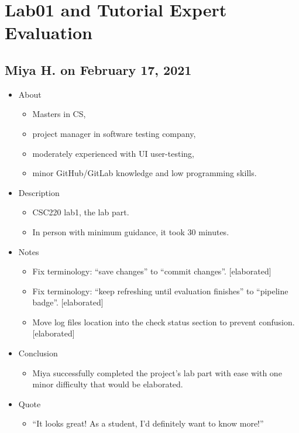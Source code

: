 \section{Lab01 and Tutorial Expert Evaluation}\label{sec:lab01exp}

\subsection{Miya H. on February 17, 2021}\label{ssec:miya0217}

\begin{itemize}
\item
  {About}
  \begin{itemize}
  \item
    {Masters in CS,}
  \item
    {project manager in software testing company,}
  \item
    {moderately experienced with UI user-testing,}
  \item
    {minor GitHub/GitLab knowledge and low programming skills.}
  \end{itemize}

\item
  {Description}
  \begin{itemize}
  \item
    {CSC220 lab1, the lab part.}
  \item
    {In person with minimum guidance, it took 30 minutes.}
  \end{itemize}

\item
  {Notes}
  \begin{itemize}
  \item
    {Fix terminology: ``save changes'' to ``commit changes''. {[}elaborated{]}}
  \item
    {Fix terminology: ``keep refreshing until evaluation finishes'' to ``pipeline badge''. {[}elaborated{]}}
  \item
    {Move log files location into the check status section to prevent confusion. {[}elaborated{]}}
  \end{itemize}

\item
  {Conclusion}
  \begin{itemize}
  \item
    {Miya successfully completed the project's lab part with ease with one minor difficulty that would be elaborated.}
  \end{itemize}

\item
  {Quote}
  \begin{itemize}
  \item
    {``It looks great! As a student, I'd definitely want to know more!''}
  \end{itemize}
\end{itemize}


